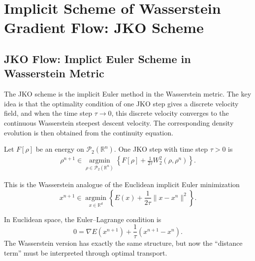 \documentclass[11pt]{book}
\newcommand{\R}{\mathbb{R}}
\newcommand{\Ptwo}{\mathcal{P}_2(\mathbb{R}^n)}
\newcommand{\W}{W_2}
\begin{document}
\section[JKO Scheme]{Implicit Scheme of Wasserstein Gradient Flow: JKO Scheme}



\subsection{JKO Flow: Implict Euler Scheme in Wasserstein Metric}

The JKO scheme is the implicit Euler method in the Wasserstein metric. The key idea is that the optimality condition of one JKO step gives a discrete velocity field, and when the time step $\tau \to 0$, this discrete velocity converges to the continuous Wasserstein steepest descent velocity. The corresponding density evolution is then obtained from the continuity equation.



Let $F[\rho]$ be an energy on $\Ptwo$. One JKO step with time step $\tau>0$ is
\begin{align}\label{eq:JKO}
\rho^{n+1}\in \operatorname*{argmin}_{\rho\in\Ptwo}
\left\{F[\rho] + \frac{1}{2\tau}\W^2(\rho,\rho^n)\right\}.
\end{align}

This is the Wasserstein analogue of the Euclidean implicit Euler minimization
\[
x^{n+1}\in \operatorname*{argmin}_{x\in \R^d}
\left\{E(x)+\frac{1}{2\tau}\|x-x^n\|^2\right\}.
\]

In Euclidean space, the Euler--Lagrange condition is
\[
0 = \nabla E(x^{n+1}) + \frac{1}{\tau}(x^{n+1}-x^n).
\]
The Wasserstein version has exactly the same structure, but now the ``distance term'' must be interpreted through optimal transport.
\end{document}
